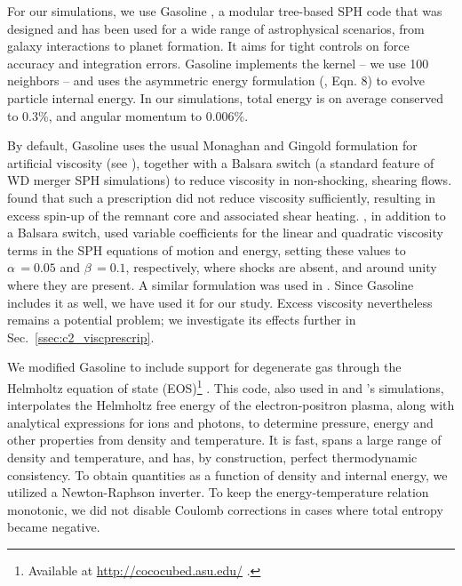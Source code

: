 For our simulations, we use Gasoline \citep{wadssq04}, a modular tree-based SPH code that was designed and has been used for a wide range of astrophysical scenarios, from galaxy interactions to planet formation.  It aims for tight controls on force accuracy and integration errors.  Gasoline implements the \cite{hernk89} kernel -- we use 100 neighbors -- and uses the asymmetric energy formulation (\citealt{wadssq04}, Eqn. 8) to evolve particle internal energy.  In our simulations, total energy is on average conserved to 0.3\%, and angular momentum to 0.006\%.

By default, Gasoline uses the usual Monaghan and Gingold formulation for artificial viscosity (see \citealt{mona05}), together with a Balsara switch (a standard feature of WD merger SPH simulations) to reduce viscosity in non-shocking, shearing flows.  \cite{guerig04} found that such a prescription did not reduce viscosity sufficiently, resulting in excess spin-up of the remnant core and associated shear heating.  \cite{yoonpr07}, in addition to a Balsara switch, used variable coefficients for the linear and quadratic viscosity terms in the SPH equations of motion and energy, setting these values to $\alpha\,=0.05$ and $\beta\,=0.1$, respectively, where shocks are absent, and around unity where they are present.  A similar formulation was used in \cite{dan+11,dan+12}.  Since Gasoline includes it as well, we have used it for our study.  Excess viscosity nevertheless remains a potential problem;  we investigate its effects further in Sec.~\ref{ssec:c2_viscprescrip}.

We modified Gasoline to include support for degenerate gas through the Helmholtz equation of state (EOS)\footnote{Available at \url{http://cococubed.asu.edu/} .} \citep{timms00}.  This code, also used in \cite{rask+12} and \cite{dan+12}'s simulations, interpolates the Helmholtz free energy of the electron-positron plasma, along with analytical expressions for ions and photons, to determine pressure, energy and other properties from density and temperature.  It is fast, spans a large range of density and temperature, and has, by construction, perfect thermodynamic consistency.  To obtain quantities as a function of density and internal energy, we utilized a Newton-Raphson inverter.  To keep the energy-temperature relation monotonic, we did not disable Coulomb corrections in cases where total entropy became negative.


